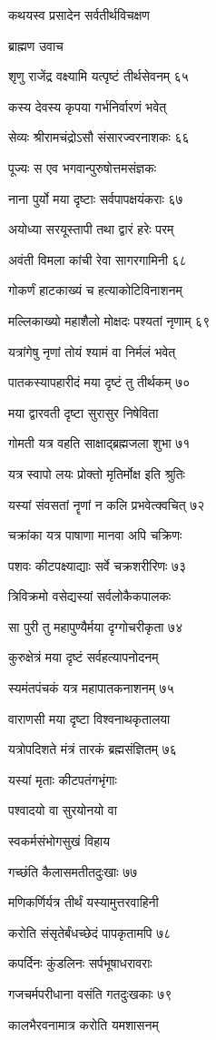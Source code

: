 कथयस्व प्रसादेन सर्वतीर्थविचक्षण

ब्राह्मण उवाच

शृणु राजेंद्र वक्ष्यामि यत्पृष्टं तीर्थसेवनम् ६५

कस्य देवस्य कृपया गर्भनिर्वारणं भवेत्

सेव्यः श्रीरामचंद्रोऽसौ संसारज्वरनाशकः ६६

पूज्यः स एव भगवान्पुरुषोत्तमसंज्ञकः

नाना पुर्यो मया दृष्टाः सर्वपापक्षयंकराः ६७

अयोध्या सरयूस्तापी तथा द्वारं हरेः परम्

अवंती विमला कांची रेवा सागरगामिनी ६८

गोकर्णं हाटकाख्यं च हत्याकोटिविनाशनम्

मल्लिकाख्यो महाशैलो मोक्षदः पश्यतां नृणाम् ६९

यत्रांगेषु नृणां तोयं श्यामं वा निर्मलं भवेत्

पातकस्यापहारीदं मया दृष्टं तु तीर्थकम् ७०

मया द्वारवती दृष्टा सुरासुर निषेविता

गोमती यत्र वहति साक्षाद्ब्रह्मजला शुभा ७१

यत्र स्वापो लयः प्रोक्तो मृतिर्मोक्ष इति श्रुतिः

यस्यां संवसतां नॄणां न कलि प्रभवेत्क्वचित् ७२

चक्रांका यत्र पाषाणा मानवा अपि चक्रिणः

पशवः कीटपक्ष्याद्याः सर्वे चक्रशरीरिणः ७३

त्रिविक्रमो वसेद्यस्यां सर्वलोकैकपालकः

सा पुरी तु महापुण्यैर्मया दृग्गोचरीकृता ७४

कुरुक्षेत्रं मया दृष्टं सर्वहत्यापनोदनम्

स्यमंतपंचकं यत्र महापातकनाशनम् ७५

वाराणसी मया दृष्टा विश्वनाथकृतालया

यत्रोपदिशते मंत्रं तारकं ब्रह्मसंज्ञितम् ७६

यस्यां मृताः कीटपतंगभृंगाः

पश्वादयो वा सुरयोनयो वा

स्वकर्मसंभोगसुखं विहाय

गच्छंति कैलासमतीतदुःखाः ७७

मणिकर्णिर्यत्र तीर्थं यस्यामुत्तरवाहिनी

करोति संसृतेर्बंधच्छेदं पापकृतामपि ७८

कपर्दिनः कुंडलिनः सर्पभूषाधरावराः

गजचर्मपरीधाना वसंति गतदुःखकाः ७९

कालभैरवनामात्र करोति यमशासनम्

